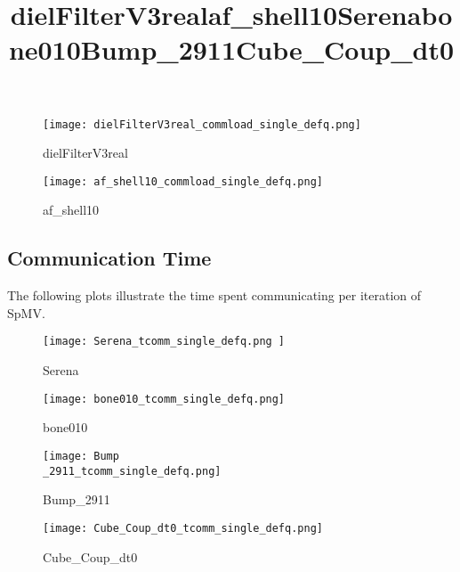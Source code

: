 \begin{figure}[H]
    \title{dielFilterV3real}
    \begin{center}
        \texttt{[image: dielFilterV3real\_commload\_single\_defq.png]}
    \end{center}
    \caption{dielFilterV3real}
    \label{fig:dielFilterV3real_commload_single_defq.png}
\end{figure}

\begin{figure}[H]
    \title{af\_shell10}
    \begin{center}
        \texttt{[image: af\_shell10\_commload\_single\_defq.png]}
    \end{center}
    \caption{af\_shell10}
    \label{fig:af_shell10_defq_commload_single.png}
\end{figure}

\subsection{Communication Time}
The following plots illustrate the time spent communicating per iteration of SpMV.

\begin{figure}[H]
    \title{Serena}
    \begin{center}
        \texttt{[image: Serena\_tcomm\_single\_defq.png ]}
    \end{center}
    \caption{Serena}
    \label{fig:Serena_tcomm_single_defq.png}
\end{figure}

\begin{figure}[H]
    \title{bone010}
    \begin{center}
        \texttt{[image: bone010\_tcomm\_single\_defq.png]}
    \end{center}
    \caption{bone010}
    \label{fig:bone010_tcomm_single_defq.png}
\end{figure}

\begin{figure}[H]
    \title{Bump\_2911}
    \begin{center}
        \texttt{[image: Bump\\\_2911\_tcomm\_single\_defq.png]}
    \end{center}
    \caption{Bump\_2911}
    \label{fig:Bump_2911_defq_tcomm_single.png}
\end{figure}

\begin{figure}[H]
    \title{Cube\_Coup\_dt0}
    \begin{center}
        \texttt{[image: Cube\_Coup\_dt0\_tcomm\_single\_defq.png]}
    \end{center}
    \caption{Cube\_Coup\_dt0}
    \label{fig:Cube_Coup_dt0_tcomm_single_defq.png}
\end{figure}

